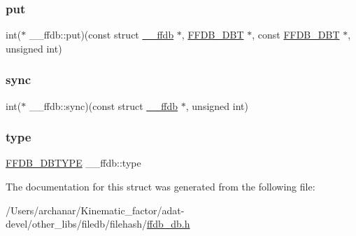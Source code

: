 \subsubsection{\texorpdfstring{put}{put}}
{\footnotesize\ttfamily int($\ast$ \+\_\+\+\_\+ffdb\+::put)(const struct \mbox{\hyperlink{struct____ffdb}{\+\_\+\+\_\+ffdb}} $\ast$, \mbox{\hyperlink{adat-devel_2other__libs_2filedb_2filehash_2ffdb__db_8h_aa2e0984399491df0fdd20898ca8758f9}{F\+F\+D\+B\+\_\+\+D\+BT}} $\ast$, const \mbox{\hyperlink{adat-devel_2other__libs_2filedb_2filehash_2ffdb__db_8h_aa2e0984399491df0fdd20898ca8758f9}{F\+F\+D\+B\+\_\+\+D\+BT}} $\ast$, unsigned int)}

\mbox{\label{struct____ffdb_ac62e77f33be0e087840288a34afa7505}} 
\subsubsection{\texorpdfstring{sync}{sync}}
{\footnotesize\ttfamily int($\ast$ \+\_\+\+\_\+ffdb\+::sync)(const struct \mbox{\hyperlink{struct____ffdb}{\+\_\+\+\_\+ffdb}} $\ast$, unsigned int)}

\mbox{\label{struct____ffdb_a97cc74bb16c35a0a927331f4e2aa0734}} 
\subsubsection{\texorpdfstring{type}{type}}
{\footnotesize\ttfamily \mbox{\hyperlink{adat-devel_2other__libs_2filedb_2filehash_2ffdb__db_8h_ad525b587adc6d7028c6f7bf7e8204185}{F\+F\+D\+B\+\_\+\+D\+B\+T\+Y\+PE}} \+\_\+\+\_\+ffdb\+::type}



The documentation for this struct was generated from the following file\+:\begin{DoxyCompactItemize}
\item 
/\+Users/archanar/\+Kinematic\+\_\+factor/adat-\/devel/other\+\_\+libs/filedb/filehash/\mbox{\hyperlink{adat-devel_2other__libs_2filedb_2filehash_2ffdb__db_8h}{ffdb\+\_\+db.\+h}}\end{DoxyCompactItemize}
